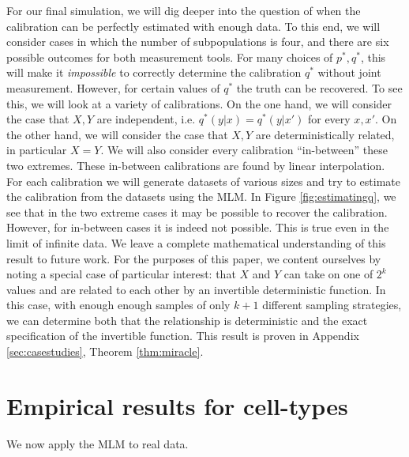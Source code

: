 For our final simulation, we will dig deeper into the question of when the calibration can be perfectly estimated with enough data.  To this end, we will consider cases in which the number of subpopulations is four, and there are six possible outcomes for both measurement tools.  For many choices of $p^*,q^*$, this will make it \emph{impossible} to correctly determine the calibration $q^*$ without joint measurement.  However, for certain values of $q^*$ the truth can be recovered.  To see this, we will look at a variety of calibrations.  On the one hand, we will consider the case that $X,Y$ are independent, i.e. $q^*(y|x)=q^*(y|x')$ for every $x,x'$.  On the other hand, we will consider the case that $X,Y$ are deterministically related, in particular $X=Y$.  We will also consider every calibration ``in-between'' these two extremes.  These in-between calibrations are found by linear interpolation.  For each calibration we will generate datasets of various sizes and try to estimate the calibration from the datasets using the MLM.  In Figure \ref{fig:estimatingq}, we see that in the two extreme cases it may be possible to recover the calibration.  However, for in-between cases it is indeed not possible.  This is true even in the limit of infinite data.  We leave a complete mathematical understanding of this result to future work.  For the purposes of this paper, we content ourselves by noting a special case of particular interest: that $X$ and $Y$ can take on one of $2^k$ values and are related to each other by an invertible deterministic function.  In this case, with enough enough samples of only $k+1$ different sampling strategies, we can determine both that the relationship is deterministic and the exact specification of the invertible function.  This result is proven in Appendix \ref{sec:casestudies}, Theorem \ref{thm:miracle}.

                                       

\section{Empirical results for cell-types}

We now apply the MLM to real data.

